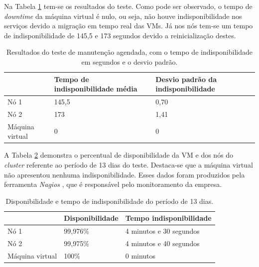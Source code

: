 Na Tabela \ref{tab:teste3resultados} tem-se os resultados do teste. Como pode ser observado, o tempo de \textit{downtime} da máquina virtual 
é nulo, ou seja, não houve indisponibilidade nos serviços devido a migração em tempo real das \acp{VM}. 
Já nos nós  tem-se um tempo de indisponibilidade de 145,5 e 173 segundos devido a reinicialização destes.


\begin{table}[h!]
\caption{Resultados do teste de manutenção agendada, com o tempo de indisponibilidade em segundos e o desvio padrão.}
\small
\label{tab:teste3resultados}
\begin{center}
\begin{tabular}{|l|p{5.5cm}|p{5.5cm}|}\hline
 & \textbf{Tempo de indisponibilidade média} & \textbf{Desvio padrão da indisponibilidade} \\\hline
Nó 1 & 145,5 & 0,70 \\\hline
Nó 2 & 173 & 1,41 \\\hline
Máquina virtual & 0 & 0 \\\hline
\end{tabular}
\end{center}
\end{table}

A Tabela \ref{tab:teste3disp} demonstra o percentual de disponibilidade da \ac{VM} e dos nós do \textit{cluster} referente ao período de 13 dias
do teste. Destaca-se que a máquina virtual não apresentou nenhuma indisponibilidade. 
Esses dados foram produzidos pela ferramenta \textit{Nagios} \cite{nagios}, que é responsável pelo monitoramento da empresa.

\begin{table}[h!]
\caption{Disponibilidade e tempo de indisponibilidade do período de 13 dias.}
\small
\label{tab:teste3disp}
\begin{center}
\begin{tabular}{|l|p{5.5cm}|p{5.5cm}|}\hline
 & \textbf{Disponibilidade} & \textbf{Tempo indisponibilidade} \\\hline
Nó 1 & 99,976\% & 4 minutos e 30 segundos \\\hline
Nó 2 & 99,975\% & 4 minutos e 40 segundos \\\hline
Máquina virtual & 100\% & 0 minutos \\\hline
\end{tabular}
\end{center}
\end{table}

